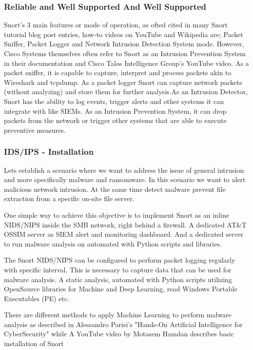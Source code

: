 \subsubsection{Reliable and Well Supported And Well Supported}



Snort's 3 main features or mode of operation, as ofted cited in many Snort tutorial blog post entries, how-to videos on YouTube and Wikipedia are; Packet Sniffer, Packet Logger and Network Intrusion Detection System mode\cite{Wikipedia2022_Snort}. However, Cisco Systems themselves often refer to Snort as an Intrusion Prevention System in their documentation\cite{Ciscco_Snort3_Configuration_Guide_v7} and Cisco Talos Intelligence Group's YouTube video\cite{TIG2020_Snort_101}. As a packet sniffer, it is capable to capture, interpret and process packets akin to Wireshark and tcpdump. As a packet logger Snort can capture network packets (without analyzing) and store them for further analysis.As an Intrusion Detector, Snort has the ability to log events, trigger alerts and other systems it can integrate with like SIEMs. As an Intrusion Prevention System, it can drop packets from the network or trigger other systems that are able to execute preventive measures.\\

\subsubsection{IDS/IPS - Installation}

Lets establish a scenario where we want to address the issue of general intrusion and more specifically malware and ransomware. In this scenario we want to alert malicious network intrusion. At the same time detect malware prevent file extraction from a specific on-site file server.

One simple way to achieve this objective is to implement Snort as an inline NIDS/NIPS inside the SMB network, right behind a firewall. A dedicated AT\&T OSSIM server as SIEM alert and monitoring dashboard. And a dedicated server to run malware analysis on automated with Python scripts and libraries.

The Snort NIDS/NIPS can be configured to perform packet logging regularly with specific interval. This is necessary to capture data that can be used for malware analysis. A static analysis, automated with Python scripts utilizing OpenSource libraries for Machine and Deep Learning, read Windows Portable Executables (PE) etc.

There are different methods to apply Machine Learning to perform malware analysis as described in Alessandro Parisi's "Hands-On Artificial Intelligence for CyberSecurity"\cite{Parisi2019} while A YouTube video by Motasem Hamdan describes basic installation of Snort\cite{YouTube2022_HamdanM}\\